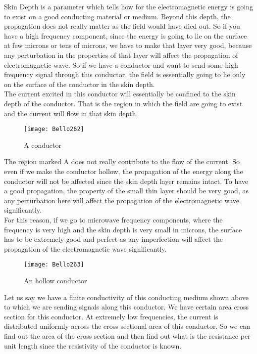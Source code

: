 		Skin Depth is a parameter which tells how for the electromagnetic energy is going to exist on a good conducting material or medium. Beyond this depth, the propagation does not really matter as the field would have died out. So if you have a high frequency component, since the energy is going to lie on the surface at few microns or tens of microns, we have to make that layer very good, because any perturbation in the properties of that layer will affect the propagation of electromagnetic wave. So if we have a conductor and want to send some high frequency signal through this conductor, the field is essentially going to lie only on the surface of the conductor in the skin depth.\\
		
		The current excited in this conductor will essentially be confined to the skin depth of the conductor. That is the region in which the field are going to exist and the current will flow in that skin depth.\\
\begin{figure}[h]
	\centering
	\texttt{[image: Bello262]}
	\caption{A conductor}
\end{figure}		
		The region marked A does not really contribute to the flow of the current. So even if we make the conductor hollow, the propagation of the energy along the conductor will not be affected since the skin depth layer remains intact. To have a good propagation, the property of the small thin layer should be very good, as any perturbation here will affect the propagation of the electromagnetic wave significantly.\\		
		For this reason, if we go to microwave frequency components, where the frequency is very high and the skin depth is very small in microns, the surface has to be extremely good and perfect as any imperfection will affect the propagation of the electromagnetic wave significantly.\\
		\begin{figure}[h]
			\centering
			\texttt{[image: Bello263]}
			\caption{An hollow conductor}
		\end{figure}
		 Let us say we have a finite conductivity of this conducting medium shown above to which we are sending signals along this conductor. We have certain area cross section for this conductor. At extremely low frequencies, the current is distributed uniformly across the cross sectional area of this conductor. So we can find out the area of the cross section and then find out what is the resistance per unit length since the resistivity of the conductor is known.\\
		

